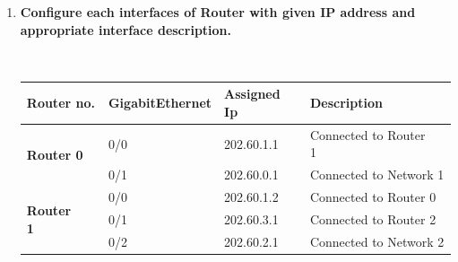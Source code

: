 \documentclass[a4paper,11pt]{article}
\begin{document}
\begin{enumerate}
    \item\textbf{ Configure each interfaces of Router with given IP address and appropriate interface  description.}



          \begin{table}[H]
              \centering
              \
              \begin{tabular}{|l|l|l|l|}
                  \hline
                  \rowcolor[rgb]{0.443,0.831,1} \textbf{Router no.} & {\cellcolor[rgb]{0.325,1,0.784}}\textbf{GigabitEthernet} & \textbf{Assigned Ip} & \textbf{Description}    \\
                  \hline
                  \multirow{2}{*}{\textbf{Router 0~ }}              & {\cellcolor[rgb]{0.325,1,0.784}}0/0                      & 202.60.1.1           & Connected to Router 1~~ \\
                  \hhline{|~---|}
                                                                    & {\cellcolor[rgb]{0.325,1,0.784}}0/1                      & 202.60.0.1           & Connected to Network 1  \\
                  \hline
                  \multirow{3}{*}{\textbf{Router 1~~ }}             & {\cellcolor[rgb]{0.325,1,0.784}}0/0                      & 202.60.1.2           & Connected to Router 0   \\
                  \hhline{|~---|}
                                                                    & {\cellcolor[rgb]{0.325,1,0.784}}0/1                      & 202.60.3.1           & Connected to Router 2   \\
                  \hhline{|~---|}
                                                                    & {\cellcolor[rgb]{0.325,1,0.784}}0/2                      & 202.60.2.1           & Connected to Network 2  \\

\end{tabular}
\end{table}
\end{enumerate}
\end{document}
